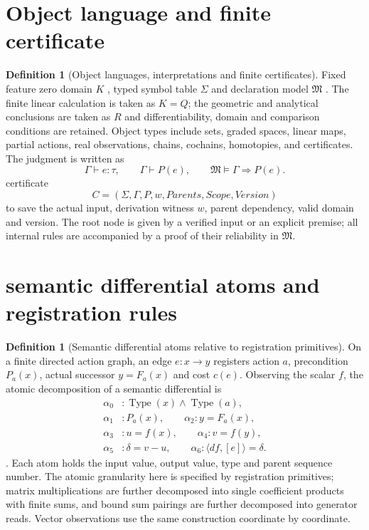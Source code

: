 \documentclass[12pt,a4paper,openany,notitlepage]{report}
\theoremstyle{plain}
\theoremstyle{definition}
\newtheorem{definition}[theorem]{Definition}
\theoremstyle{remark}
\def\mathcal#1{#1}\def\mathsf#1{#1}\def\mathbb#1{#1}%
\begin{document}
\begin{CJK*}
\section { Object language and finite certificate }

\begin{definition}
[Object languages, interpretations and finite certificates]\label{hgov:def:language}
Fixed feature zero domain $\mathbb K$ , typed symbol table $\Sigma$ and declaration model $\mathfrak M$ . The finite linear calculation is taken as $\mathbb K=\mathbb Q$; the geometric and analytical conclusions are taken as $\mathbb R$ and differentiability, domain and comparison conditions are retained. Object types include sets, graded spaces, linear maps, partial actions, real observations, chains, cochains, homotopies, and certificates. The judgment is written as \[
\Gamma\vdash e:\tau,\qquad \Gamma\vdash P(e),\qquad
\mathfrak M\models\Gamma\Rightarrow P(e).
\] certificate \[
\mathcal C=(\Sigma,\Gamma,P,w,\mathsf{Parents},\mathsf{Scope},\mathsf{Version})
\] to save the actual input, derivation witness $w$, parent dependency, valid domain and version. The root node is given by a verified input or an explicit premise; all internal rules are accompanied by a proof of their reliability in $\mathfrak M$.\end{definition}


\section { semantic differential atoms and registration rules }

\begin{definition}
[Semantic differential atoms relative to registration primitives]\label{hgov:def:atom}
On a finite directed action graph, an edge $e:x\to y$ registers action $a$, precondition $P_a(x)$, actual successor $y=F_a(x)$ and cost $c(e)$. Observing the scalar $f$, the atomic decomposition of a semantic differential is \[
\begin{aligned}
\alpha_0&:\operatorname{Type}(x)\land\operatorname{Type}(a),\\
\alpha_1&:P_a(x),\qquad
\alpha_2:y=F_a(x),\\
\alpha_3&:u=f(x),\qquad
\alpha_4:v=f(y),\\
\alpha_5&:\delta=v-u,\qquad
\alpha_6:\langle df,[e]\rangle=\delta .
\end{aligned}
\]. Each atom holds the input value, output value, type and parent sequence number. The atomic granularity here is specified by registration primitives; matrix multiplications are further decomposed into single coefficient products with finite sums, and bound sum pairings are further decomposed into generator reads. Vector observations use the same construction coordinate by coordinate.\end{definition}



\end{CJK*}
\end{document}
